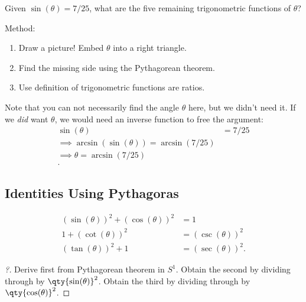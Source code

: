 \begin{example}[?]

Given \(\sin(\theta) = 7/25\), what are the five remaining trigonometric
functions of \(\theta\)?

Method:

\begin{enumerate}
\def\labelenumi{\arabic{enumi}.}
\tightlist
\item
  Draw a picture! Embed \(\theta\) into a right triangle.
\item
  Find the missing side using the Pythagorean theorem.
\item
  Use definition of trigonometric functions are ratios.
\end{enumerate}

\end{example}

\begin{remark}

Note that you can not necessarily find the angle \(\theta\) here, but we
didn't need it. If we \emph{did} want \(\theta\), we would need an
inverse function to free the argument:
\begin{align*}
\sin(\theta) &= 7/25 \\
\implies \arcsin( \sin(\theta) ) = \arcsin(7/25) \\
\implies \theta = \arcsin(7/25) \\
.\end{align*}

\end{remark}

\hypertarget{identities-using-pythagoras}{%
\subsection{Identities Using
Pythagoras}\label{identities-using-pythagoras}}

\begin{proposition}[?]

\begin{align*}
(\sin(\theta))^2 + (\cos(\theta))^2 &= 1 \\
1 + (\cot(\theta))^2 &= (\csc(\theta))^2 \\
(\tan(\theta))^2 + 1 &= (\sec(\theta))^2
.\end{align*}

\end{proposition}

\begin{proof}[?]

Derive first from Pythagorean theorem in \(S^1\). Obtain the second by
dividing through by \(\qty{\sin(\theta)}^2\). Obtain the third by
dividing through by \(\qty{\cos(\theta)}^2\).

\end{proof}

